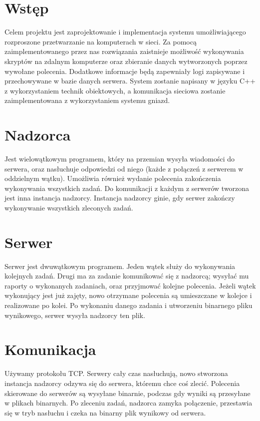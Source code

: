 \documentclass[11pt,a4paper]{article}
\begin{document}
\section{Wstęp}
Celem projektu jest zaprojektowanie i implementacja systemu umożliwiającego rozproszone przetwarzanie na komputerach w sieci. Za pomocą zaimplementowanego przez nas rozwiązania zaistnieje możliwość wykonywania skryptów na zdalnym komputerze oraz zbieranie danych wytworzonych poprzez wywołane polecenia. Dodatkowe informacje będą zapewniały logi zapisywane i przechowywane w bazie danych serwera. System zostanie napisany w języku C++ z wykorzystaniem technik obiektowych, a komunikacja sieciowa zostanie zaimplementowana z wykorzystaniem systemu gniazd.

\section{Nadzorca}
Jest wielowątkowym programem, który na przemian wysyła wiadomości do serwera, oraz nasłuchuje odpowiedzi od niego (każde z połączeń z serwerem w oddzielnym wątku). Umożliwia również wydanie polecenia zakończenia wykonywania wszystkich zadań. Do komunikacji z każdym z serwerów tworzona jest inna instancja nadzorcy. Instancja nadzorcy ginie, gdy serwer zakończy wykonywanie wszystkich zleconych zadań.

\section{Serwer}
Serwer jest dwuwątkowym programem. Jeden wątek służy do wykonywania kolejnych zadań. Drugi ma za zadanie komunikować się z nadzorcą; wysyłać mu raporty o wykonanych zadaniach, oraz przyjmować kolejne polecenia. Jeżeli wątek wykonujący jest już zajęty, nowo otrzymane polecenia są umieszczane w kolejce i realizowane po kolei. Po wykonaniu danego zadania i utworzeniu binarnego pliku wynikowego, serwer wysyła nadzorcy ten plik.

\section{Komunikacja}
Używamy protokołu TCP. Serwery cały czas nasłuchują, nowo stworzona instancja nadzorcy odzywa się do serwera, któremu chce coś zlecić. Polecenia skierowane do serwerów są wysyłane binarnie, podczas gdy wyniki są przesyłane w plikach binarnych. Po zleceniu zadań, nadzorca zamyka połączenie, przestawia się w tryb nasłuchu i czeka na binarny plik wynikowy od serwera.
\end{document}
